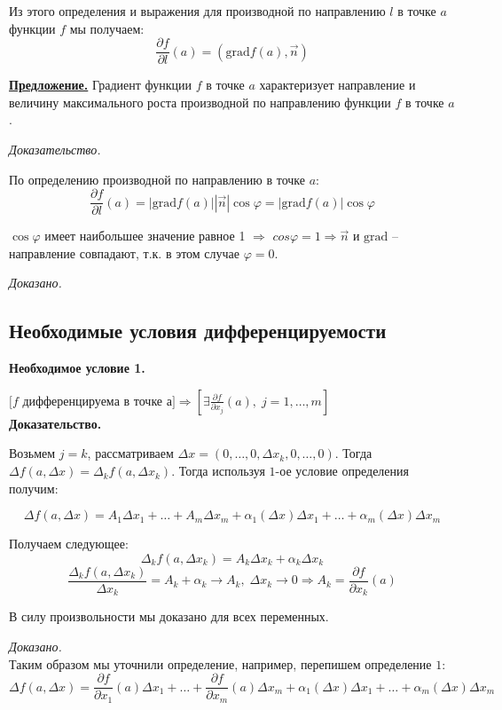 \documentclass[a4paper,12pt]{article} %
\begin{document}
	Из этого определения и выражения для производной по направлению $l$ в точке $a$ функции $f$ мы получаем:
	\[\frac{\partial f}{\partial l}(a) = (\mathrm{grad}{f(a), \vec{n}})\]
	
	\underline{\textbf{Предложение.}}
	Градиент функции $f$ в точке $a$ характеризует направление и величину максимального роста производной по направлению функции $f$ в точке $a$.
	
	\textit{Доказательство.}
	
	По определению производной по направлению в точке $a$:
	\[\frac{\partial f}{\partial l}(a) = |\mathrm{grad}{f(a)}| |\vec{n}|\cos\varphi = |\mathrm{grad}{f(a)}|\cos\varphi\]
	
	$\cos\varphi$ имеет наибольшее значение равное 1 $\Rightarrow$
	$cos\varphi = 1 \Rightarrow \vec{n}$ и $\mathrm{grad}$ -- направление совпадают, т.к. в этом случае $\varphi = 0$.
	
	\textit{Доказано.}
	\subsection{Необходимые условия дифференцируемости}
	
	\textbf{Необходимое условие 1.}
	
	$[f$ дифференцируема в точке а$] \Rightarrow [\exists \frac{\partial f}{\partial x_j}(a), \; j = 1, \ldots, m]$\\
	
	\textbf{Доказательство.}
	
	Возьмем $j = k$, рассматриваем $\Delta x = (0, \ldots, 0, \Delta x_k, 0, \ldots, 0)$. Тогда $\Delta f(a, \Delta x) = \Delta_k f(a, \Delta x_k)$. Тогда используя $1$-ое условие определения получим:
	
	\[\Delta f(a, \Delta x) = A_1 \Delta x_1 + \ldots + A_m \Delta x_m + \alpha_1(\Delta x) \Delta x_1 + \ldots + \alpha_m (\Delta x)\Delta x_m\] 
	
	Получаем следующее: 
	\[\Delta_k f(a, \Delta x_k) = A_k\Delta x_k + \alpha_k\Delta x_k\]
	\[\frac{\Delta_k f(a, \Delta x_k)}{\Delta x_k} = A_k + \alpha_k \to A_k, \; \Delta x_k \to 0 \Rightarrow A_k = \frac{\partial f}{\partial x_k} (a)\]
	
	В силу произвольности мы доказано для всех переменных.
	
	\textit{Доказано.}\\
	
	Таким образом мы уточнили определение, например, перепишем определение $1$:
	\[\Delta f(a, \Delta x) = \frac{\partial f}{\partial x_1}(a) \Delta x_1 + \ldots + \frac{\partial f}{\partial x_m}(a) \Delta x_m + \alpha_1(\Delta x) \Delta x_1 + \ldots + \alpha_m (\Delta x)\Delta x_m\]
	
\end{document}
